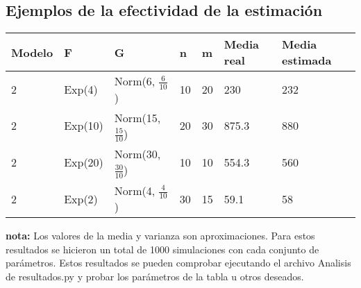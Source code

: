 \documentclass[11pt]{article}
\begin{document}
    \subsection{Ejemplos de la efectividad de la estimación}
    \begin{table}[h]
        \begin{tabular}{|l|l|l|l|l|l|l|}
            \hline \textbf{Modelo} & \textbf{F} & \textbf{G} & \textbf{n} & \textbf{m} & \textbf{Media real} & \textbf{Media estimada} \\ 
            \hline 2 & Exp(4) & Norm(6, $\frac{6}{10}$) & 10 & 20 & 230 & 232 \\
            \hline 2 & Exp(10) & Norm(15, $\frac{15}{10}$) & 20 & 30 & 875.3 & 880 \\
            \hline 2 & Exp(20) & Norm(30, $\frac{30}{10}$) & 10 & 10 & 554.3 & 560 \\
            \hline 2 & Exp(2) & Norm(4, $\frac{4}{10}$) & 30 & 15 & 59.1 & 58 \\
            \hline
        \end{tabular}
    \end{table}
    \noindent \textbf{nota:} Los valores de la media y varianza son aproximaciones. Para estos resultados se hicieron un total de 1000 
    simulaciones con cada conjunto de parámetros. Estos resultados se pueden comprobar ejecutando el archivo Analisis de resultados.py 
    y probar los parámetros de la tabla u otros deseados.
\end{document}
